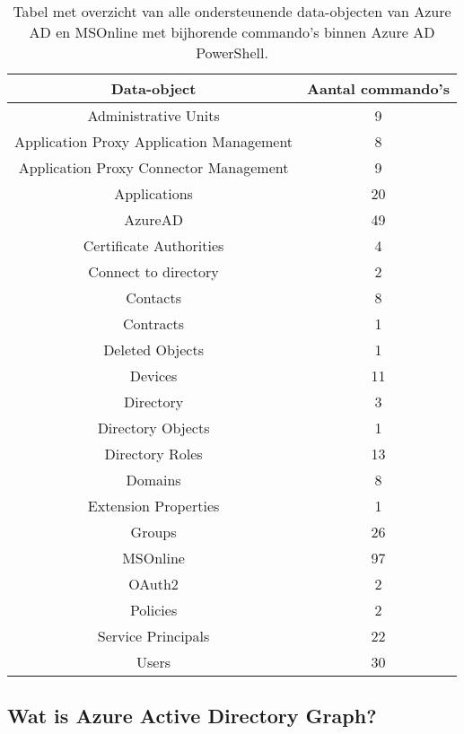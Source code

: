 \begin{table}
    \small
    \centering
    \begin{tabular}{ |c|c| } 
        \hline
        \textbf{Data-object} & \textbf{Aantal commando's} \\
        \hline
        Administrative Units & 9 \\ 
        Application Proxy Application Management & 8 \\ 
        Application Proxy Connector Management & 9 \\
        Applications & 20 \\ 
        AzureAD & 49 \\ 
        Certificate Authorities & 4 \\ 
        Connect to directory & 2 \\ 
        Contacts & 8 \\ 
        Contracts & 1 \\ 
        Deleted Objects & 1 \\ 
        Devices & 11 \\    
        Directory & 3 \\
        Directory Objects & 1 \\ 
        Directory Roles & 13 \\ 
        Domains & 8 \\ 
        Extension Properties & 1 \\ 
        Groups & 26 \\ 
        MSOnline & 97 \\
        OAuth2 & 2 \\ 
        Policies & 2 \\ 
        Service Principals & 22 \\ 
        Users & 30 \\ 
        \hline
    \end{tabular}
    \caption[Tabel Azure AD en MSonline data-objecten]{Tabel met overzicht van alle ondersteunende data-objecten van Azure \ac{AD} en MSOnline met bijhorende commando's binnen Azure \ac{AD} PowerShell.}
    \label{AADT}
\end{table}

\subsection{Wat is Azure Active Directory Graph?}


